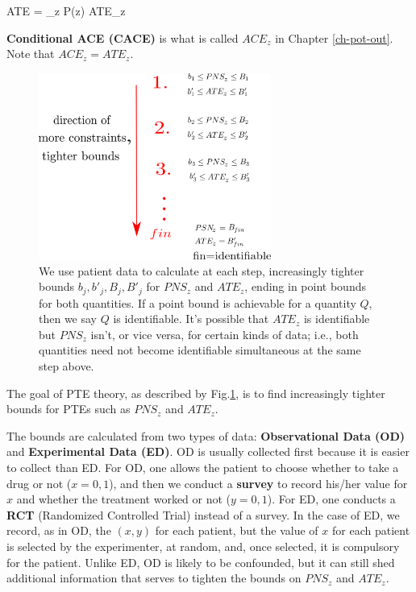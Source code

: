 \beq
ATE = \sum_z P(z) ATE_z
\eeq

{\bf Conditional ACE 
(CACE)} is what
is called
$ACE_z$ in Chapter \ref{ch-pot-out}.
Note that
$ACE_z=ATE_z$.

\begin{figure}[h!]
\centering
\includegraphics[width=3in]
{personalized/personalized-goal.png}
\caption{We use patient data 
to calculate at each step, increasingly
tighter bounds
$b_j, b'_j, B_j, B'_j$
for $PNS_z$ and $ATE_z$,
ending in point bounds
for both quantities.
If a point bound is achievable
 for a quantity $Q$,
then we say $Q$
is identifiable.
It's possible that 
$ATE_z$ is identifiable
but $PNS_z$ isn't,
or vice versa, for certain kinds
of data; i.e., both
quantities need not
become identifiable 
simultaneous at the
same step above. } 
\label{fig-personalized-goal}
\end{figure}

The goal of PTE theory, as
described by 
Fig.\ref{fig-personalized-goal}, is
to find
increasingly 
tighter bounds for
PTEs such as 
$PNS_z$ and $ATE_z$.

The bounds are calculated from
 two types of data:
{\bf Observational Data (OD)} and 
{\bf Experimental Data (ED)}.
OD is usually collected first
because it is easier to collect 
than ED.
For OD, one allows 
the patient to 
choose whether to take
a drug 
or not ($x=0,1$),
and then we conduct a {\bf survey}
to record his/her 
value for $x$ 
and whether the treatment
worked or not ($y=0,1$).
For ED, one conducts a {\bf RCT}
(Randomized Controlled Trial)
instead of a survey.
In the case of ED, 
we record, as in OD, the $(x,y)$
for each patient, but
the value of $x$ for each
patient is selected by the
experimenter, at random,
and, once selected, it
 is compulsory for the
patient.
Unlike ED, OD is likely
to be confounded, but
it can still shed 
additional information
that serves to tighten 
the bounds on 
$PNS_z$ and $ATE_z$.

